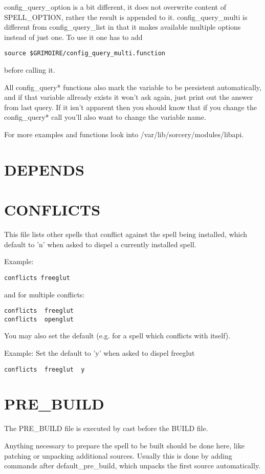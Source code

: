 \documentclass[a4paper,10pt]{book}
\begin{document}
config\_query\_option is a bit different, it does not overwrite content of
\textdollar SPELL\_OPTION, rather the result is appended to it.
config\_query\_multi is
different from config\_query\_list in that it makes available multiple options
instead of just one. To use it one has to add
\begin{verbatim}
source $GRIMOIRE/config_query_multi.function
\end{verbatim}
before calling it.

All config\_query* functions also mark the variable to be persistent
automatically, and if that variable allready exists it won't ask again, just
print out the answer from last query. If it isn't apparent then you should know
that if you change the config\_query* call you'll also want to change the
variable name.

For more examples and functions look into /var/lib/sorcery/modules/libapi.

\section{DEPENDS}
\section{CONFLICTS}
This file lists other spells that conflict against the spell being installed,
which default to 'n' when asked to dispel a currently installed spell.

Example:
\begin{verbatim}
conflicts freeglut
\end{verbatim}

and for multiple conflicts:
\begin{verbatim}
conflicts  freeglut
conflicts  openglut
\end{verbatim}

You may also set the default (e.g. for a spell which conflicts with itself).

Example: Set the default to 'y' when asked to dispel freeglut
\begin{verbatim}
conflicts  freeglut  y
\end{verbatim}

\section{PRE\_BUILD}
The PRE\_BUILD file is executed by cast before the BUILD file.

Anything necessary to prepare the spell to be built should be done here, like
patching or unpacking additional sources. Usually this is done by adding
commands after default\_pre\_build, which unpacks the first source
automatically.
\end{document}
